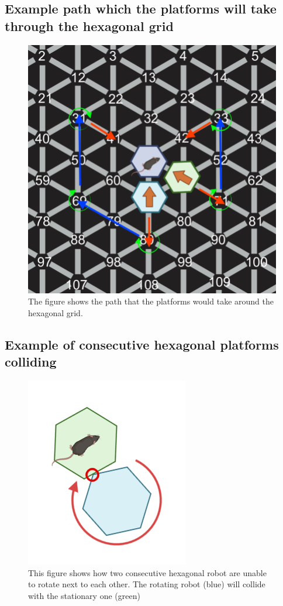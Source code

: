 \subsection{Example path which the platforms will take through the hexagonal grid}
\label{fig:example_path}
\begin{figure}[H]
    \centering
    \includegraphics[scale = 0.7]{images/example_path.png}
    \caption{The figure shows the path that the platforms would take around the hexagonal grid.}
\end{figure}



\subsection{Example of consecutive hexagonal platforms colliding}
\label{fig:collision}
\begin{figure}[H]
    \centering
    \includegraphics[scale = 0.5]{images/consec_hex_collision .png}
    \caption{This figure shows how two consecutive hexagonal robot are unable to rotate next to each other. The rotating robot (blue) will collide with the stationary one (green)}

\end{figure}

